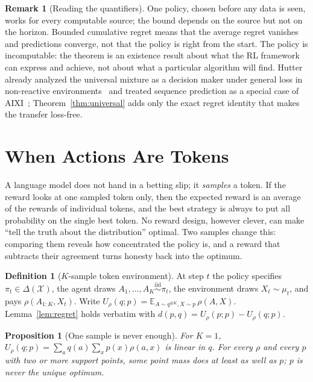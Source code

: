 \documentclass[11pt]{article}
\newtheorem{proposition}{Proposition}
\theoremstyle{definition}
\newtheorem{definition}{Definition}
\newtheorem{remark}{Remark}
\newcommand{\X}{\mathcal{X}}
\newcommand{\Del}{\Delta(\X)}
\newcommand{\E}{\mathbb{E}}
\begin{document}
\begin{remark}[Reading the quantifiers]
One policy, chosen before any data is seen, works for every computable source; the bound depends on the source but not on the horizon. Bounded cumulative regret means that the average regret vanishes and predictions converge, not that the policy is right from the start. The policy is incomputable: the theorem is an existence result about what the RL framework can express and achieve, not about what a particular algorithm will find. Hutter already analyzed the universal mixture as a decision maker under general loss in non-reactive environments~\cite{hutter2003general} and treated sequence prediction as a special case of AIXI~\cite{hutter2005book}; Theorem~\ref{thm:universal} adds only the exact regret identity that makes the transfer loss-free.
\end{remark}

\section{When Actions Are Tokens}\label{sec:tokens}

\begin{plain}
A language model does not hand in a betting slip; it \emph{samples} a token. If the reward looks at one sampled token only, then the expected reward is an average of the rewards of individual tokens, and the best strategy is always to put all probability on the single best token. No reward design, however clever, can make ``tell the truth about the distribution'' optimal. Two samples change this: comparing them reveals how concentrated the policy is, and a reward that subtracts their agreement turns honesty back into the optimum.
\end{plain}

\begin{definition}[$K$-sample token environment]
At step $t$ the policy specifies $\pi_t\in\Del$, the agent draws $A_{1},\dots,A_{K}\stackrel{\text{iid}}{\sim}\pi_t$, the environment draws $X_t\sim\mu_t$, and pays $\rho(A_{1:K},X_t)$. Write $U_\rho(q;p)=\E_{A\sim q^{\otimes K},X\sim p}\,\rho(A,X)$. Lemma~\ref{lem:regret} holds verbatim with $d(p,q)=U_\rho(p;p)-U_\rho(q;p)$.
\end{definition}

\begin{proposition}[One sample is never enough]\label{prop:single}
For $K=1$, $U_\rho(q;p)=\sum_aq(a)\sum_xp(x)\rho(a,x)$ is linear in $q$. For every $\rho$ and every $p$ with two or more support points, some point mass does at least as well as $p$; $p$ is never the unique optimum.
\end{proposition}
\end{document}
